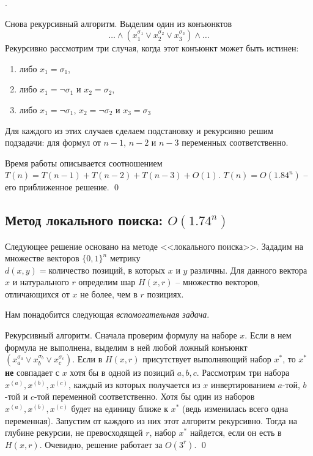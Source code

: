 \needpicture

.

Снова рекурсивный алгоритм. Выделим один из конъюнктов $$\ldots\land(x_1^{\sigma_1} \lor x_2^{\sigma_2} \lor x_3^{\sigma_3})\land\ldots$$ Рекурсивно рассмотрим три случая, когда этот конъюнкт может быть истинен:
\begin{enumerate}
\item либо $x_1 = \sigma_1$,
\item либо $x_1 = \neg\sigma_1$ и $x_2 = \sigma_2$,
\item либо $x_1 = \neg\sigma_1$, $x_2 = \neg\sigma_2$ и $x_3 = \sigma_3$
\end{enumerate}
Для каждого из этих случаев сделаем подстановку и рекурсивно решим подзадачи: для формул от $n-1$, $n-2$ и $n-3$ переменных соответственно.

Время работы описывается соотношением $T(n) = T(n-1) + T(n-2) + T(n-3) + O(1)$. $T(n) = O(1.84^n)$ -- его приближенное решение. \qed

\needpicture

\subsection{Метод локального поиска: $O(1.74^n)$}
Следующее решение основано на методе <<локального поиска>>. Зададим на множестве векторов $\{0, 1\}^n$ метрику $d(x, y) = \text{количество позиций, в которых } x \text{ и } y \text{ различны}$. Для данного вектора $x$ и натурального $r$ определим шар $H(x, r)$ -- множество векторов, отличающихся от $x$ не более, чем в $r$ позициях.

Нам понадобится следующая \hypertarget{flip20}{\textit{вспомогательная задача}}.


 Рекурсивный алгоритм. Сначала проверим формулу на наборе $x$. Если в нем формула не выполнена, выделим в ней любой ложный конъюнкт $(x_a^{\sigma_a} \lor x_b^{\sigma_b} \lor x_c^{\sigma_c})$. Если в $H(x, r)$ присутствует выполняющий набор $x^*$, то $x^*$ \textbf{не} совпадает с $x$ хотя бы в одной из позиций $a,b,c$. Рассмотрим три набора $x^{(a)}, x^{(b)}, x^{(c)}$, каждый из которых получается из $x$ инвертированием $a$-той, $b$-той и $c$-той переменной соответственно. Хотя бы один из наборов  $x^{(a)}, x^{(b)}, x^{(c)}$ будет на единицу ближе к $x^*$ (ведь изменилась всего одна переменная). Запустим от каждого из них этот алгоритм рекурсивно. Тогда на глубине рекурсии, не превосходящей $r$, набор $x^*$ найдется, если он есть в $H(x, r)$. Очевидно, решение работает за $O(3^r)$. \qed

